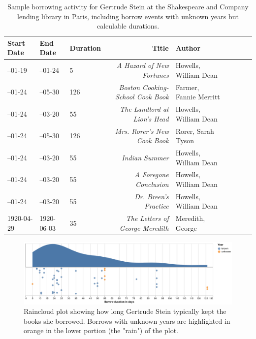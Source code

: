 \documentclass{anthology-ch}         %
\begin{document}
\begin{table}[h]
  \centering 
  \begin{tabular}{lllrllrrl}
    \toprule
    Start Date & End Date & Duration & Title & Author \\ 
    \midrule
--01-19 & --01-24 & 5 & \textit{A Hazard of New Fortunes} & Howells, William Dean \\
--01-24 & --05-30 & 126 & \textit{Boston Cooking-School Cook Book} & Farmer, Fannie Merritt \\
--01-24 & --03-20 & 55 & \textit{The Landlord at Lion's Head} & Howells, William Dean \\
--01-24 & --05-30 & 126 & \textit{Mrs. Rorer's New Cook Book} & Rorer, Sarah Tyson \\
--01-24 & --03-20 & 55 & \textit{Indian Summer} & Howells, William Dean \\
--01-24 & --03-20 & 55 & \textit{A Foregone Conclusion} & Howells, William Dean \\
--01-24 & --03-20 & 55 & \textit{Dr. Breen's Practice} & Howells, William Dean \\
1920-04-29 & 1920-06-03 & 35 & \textit{The Letters of George Meredith} & Meredith, George \\
    \bottomrule
  \end{tabular}
  \caption{Sample borrowing activity for Gertrude Stein at the Shakespeare and Company lending library in Paris, including borrow events with unknown years but calculable durations.}
  \label{tab:stein-borrowing}
\end{table}



\begin{figure}[t!]
  \centering
  \includegraphics[width=\linewidth]{assets/shxco_stein_borrows.pdf}
  \caption{Raincloud plot showing how long Gertrude Stein typically kept the books
she borrowed.  Borrows with unknown years are highlighted in orange in the lower portion (the "rain") of the plot. }
  \label{fig:stein-borrow-raincloud}
\end{figure}
\end{document}
